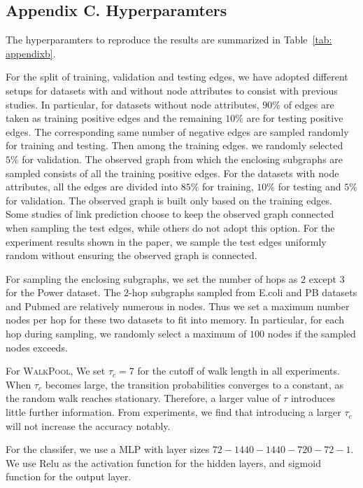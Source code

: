 \documentclass[11pt]{article}
\newcommand{\walkpool}{\textsc{WalkPool}\xspace}
\begin{document}
\subsection*{Appendix C. Hyperparamters}
The hyperparamters to reproduce the results are summarized in Table~\ref{tab: appendixb}.

For the split of training, validation and testing edges, we have adopted different setups for datasets with and without node attributes to consist with previous studies. In particular, for datasets without node attributes, $90\%$ of edges are taken as training positive edges and the remaining $10\%$ are for testing positive edges. The corresponding same number of negative edges are sampled randomly for training and testing. Then among the training edges. we randomly selected $5\%$ for validation. The observed graph from which the enclosing subgraphs are sampled consists of all the training positive edges.
For the datasets with node attributes, all the edges are divided into $85\%$ for training, $10\%$ for testing and $5\%$ for validation. The observed graph is built only based on the training edges. Some studies of link prediction choose to keep the observed graph connected when sampling the test edges, while others do not adopt this option. For the experiment results shown in the paper, we sample the test edges uniformly random without ensuring the observed graph is connected.   

For sampling the enclosing subgraphs, we set the number of hops as $2$ except $3$ for the Power dataset. The $2$-hop subgraphs sampled from E.coli and PB datasets and Pubmed are relatively numerous in nodes. Thus we set a maximum number nodes per hop for these two datasets to fit into memory. In particular, for each hop during sampling, we randomly select a maximum of $100$ nodes if the sampled nodes exceeds.

For \walkpool, We set $\tau_c = 7$ for the cutoff of walk length in all experiments. When $\tau_c$ becomes large, the transition probabilities converges to a constant, as the random walk reaches stationary. Therefore, a larger value of $\tau$ introduces little further information. From experiments, we find that introducing a larger $\tau_c$ will not increase the accuracy notably. 

For the classifer, we use a MLP with layer sizes $72-1440-1440-720-72-1$. We use Relu as the activation function for the hidden layers, and sigmoid function for the output layer.
\end{document}
